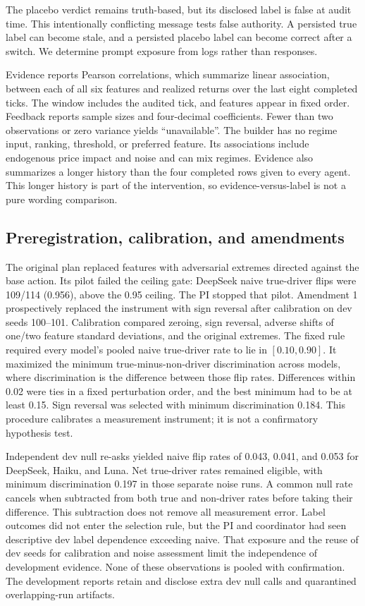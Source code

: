 \documentclass[a4paper]{article}
\begin{document}
The placebo verdict remains truth-based, but its disclosed label is false at audit time. This intentionally conflicting message tests false authority. A persisted true label can become stale, and a persisted placebo label can become correct after a switch. We determine prompt exposure from logs rather than responses.

Evidence reports Pearson correlations, which summarize linear association, between each of all six features and realized returns over the last eight completed ticks. The window includes the audited tick, and features appear in fixed order. Feedback reports sample sizes and four-decimal coefficients. Fewer than two observations or zero variance yields ``unavailable''. The builder has no regime input, ranking, threshold, or preferred feature. Its associations include endogenous price impact and noise and can mix regimes. Evidence also summarizes a longer history than the four completed rows given to every agent. This longer history is part of the intervention, so evidence-versus-label is not a pure wording comparison.

\subsection{Preregistration, calibration, and amendments}\label{sec:amendments}
The original plan replaced features with adversarial extremes directed against the base action. Its pilot failed the ceiling gate: DeepSeek naive true-driver flips were 109/114 (0.956), above the 0.95 ceiling. The PI stopped that pilot. Amendment 1 prospectively replaced the instrument with sign reversal after calibration on dev seeds 100--101. Calibration compared zeroing, sign reversal, adverse shifts of one/two feature standard deviations, and the original extremes. The fixed rule required every model's pooled naive true-driver rate to lie in $[0.10,0.90]$. It maximized the minimum true-minus-non-driver discrimination across models, where discrimination is the difference between those flip rates. Differences within 0.02 were ties in a fixed perturbation order, and the best minimum had to be at least 0.15. Sign reversal was selected with minimum discrimination 0.184. This procedure calibrates a measurement instrument; it is not a confirmatory hypothesis test.

Independent dev null re-asks yielded naive flip rates of 0.043, 0.041, and 0.053 for DeepSeek, Haiku, and Luna. Net true-driver rates remained eligible, with minimum discrimination 0.197 in those separate noise runs. A common null rate cancels when subtracted from both true and non-driver rates before taking their difference. This subtraction does not remove all measurement error. Label outcomes did not enter the selection rule, but the PI and coordinator had seen descriptive dev label dependence exceeding naive. That exposure and the reuse of dev seeds for calibration and noise assessment limit the independence of development evidence. None of these observations is pooled with confirmation. The development reports retain and disclose extra dev null calls and quarantined overlapping-run artifacts.
\end{document}
